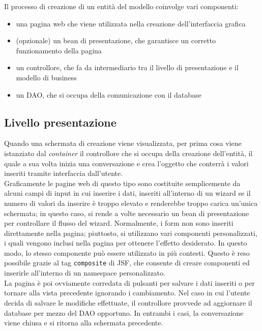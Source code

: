 
Il processo di creazione di un entità del modello coinvolge vari componenti:

\begin{itemize}
\item una pagina web che viene utilizzata nella creazione dell'interfaccia grafica
\item (opzionale) un bean di presentazione, che garantisce un corretto funzionamento della pagina
\item un controllore, che fa da intermediario tra il livello di presentazione e il modello di business
\item un DAO, che si occupa della comunicazione con il database
\end{itemize}

\subsection{Livello presentazione}

Quando una schermata di creazione viene visualizzata, per prima cosa viene istanziato dal \textit{container} il controllore che si occupa della creazione dell'entità, il quale a sua volta inizia una conversazione e crea l'oggetto che conterrà i valori inseriti tramite interfaccia dall'utente.\\
Graficamente le pagine web di questo tipo sono costituite semplicemente da alcuni campi di input in cui inserire i dati, inseriti all'interno di un wizard se il numero di valori da inserire è troppo elevato e renderebbe troppo carica un'unica schermata; in questo caso, si rende a volte necessario un bean di presentazione per controllare il flusso del wizard. Normalmente, i form non sono inseriti direttamente nella pagina; piuttosto, si utilizzano vari componenti personalizzati, i quali vengono inclusi nella pagina per ottenere l'effetto desiderato. In questo modo, lo stesso componente può essere utilizzato in più contesti. Questo è reso possibile grazie al tag \lstinline{composite} di JSF, che consente di creare componenti ed inserirle all'interno di un namespace personalizzato.\\
La pagina è poi ovviamente corredata di pulsanti per salvare i dati inseriti o per tornare alla vista precedente ignorando i cambiamento. Nel caso in cui l'utente decida di salvare le modifiche effettuate, il controllore provvede ad aggiornare il database per mezzo del DAO opportuno. In entrambi i casi, la conversazione viene chiusa e si ritorna alla schermata precedente.